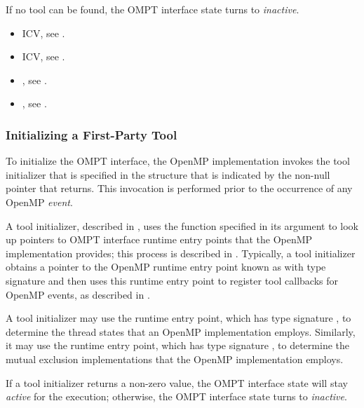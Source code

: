 If no tool can be found, the OMPT interface state turns to \emph{inactive}.

\crossreferences
\begin{itemize}
\item {} ICV, see .
\item {} ICV, see .
\item {}, see .
\item {}, see .
\end{itemize}

\subsubsection{Initializing a First-Party Tool}
\label{sec:tool-initialize}

To initialize the OMPT interface, the OpenMP implementation invokes the tool 
initializer that is specified in the  structure
that is indicated by the non-null pointer that  returns.
This invocation is performed prior to the occurrence of any OpenMP \emph{event}.

A tool initializer, described in , uses the function 
specified in its  argument to look up pointers to OMPT interface runtime 
entry points that the OpenMP implementation provides; this process is described in 
. Typically, a tool initializer obtains a pointer to the 
OpenMP runtime entry point known as  with type signature
 and then uses this runtime entry point to register tool 
callbacks for OpenMP events, as described in .

A tool initializer may use the  runtime entry 
point, which has type signature , to determine 
the thread states that an OpenMP implementation employs. Similarly, it may
use the  runtime entry point, which has 
type signature , to determine the mutual
exclusion implementations that the OpenMP implementation employs.

If a tool initializer returns a non-zero value, the OMPT interface state
will stay \emph{active} for the execution; otherwise, the OMPT 
interface state turns to \emph{inactive}.

